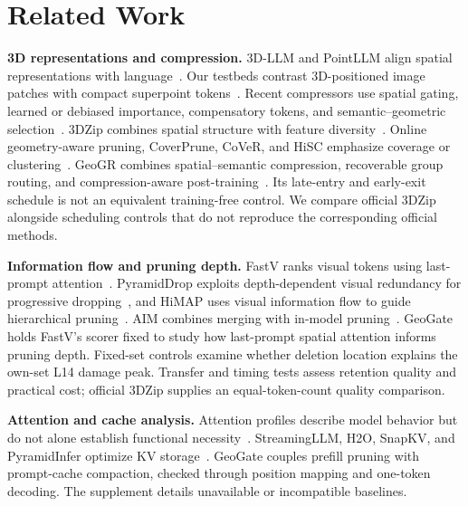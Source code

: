 \section{Related Work}
\textbf{3D representations and compression.} 3D-LLM and PointLLM align spatial representations with language~\citep{hong20233dllm,xu2024pointllm}. Our testbeds contrast 3D-positioned image patches with compact superpoint tokens~\citep{zhu2024llava3d,deng20253dllava}. Recent compressors use spatial gating, learned or debiased importance, compensatory tokens, and semantic--geometric selection~\citep{wu2025adatoken3d,huang2025fast3d, lin2026efficient3d,zhang2026hcc3d,li2026segpruner,li2026geo3dpruner}. 3DZip combines spatial structure with feature diversity~\citep{baek2026zip}. Online geometry-aware pruning, CoverPrune, CoVeR, and HiSC emphasize coverage or clustering~\citep{lai2026seeing, ling2026coverprune,bui2026cover,qu2026hisc}. GeoGR combines spatial--semantic compression, recoverable group routing, and compression-aware post-training~\citep{zheng2026geogr}. Its late-entry and early-exit schedule is not an equivalent training-free control. We compare official 3DZip alongside scheduling controls that do not reproduce the corresponding official methods.

\textbf{Information flow and pruning depth.} FastV ranks visual tokens using last-prompt attention~\citep{chen2024fastv}. PyramidDrop exploits depth-dependent visual redundancy for progressive dropping~\citep{yuan2024pyramiddrop}, and HiMAP uses visual information flow to guide hierarchical pruning~\citep{yin2025himap}. AIM combines merging with in-model pruning~\citep{zhong2025aim}. GeoGate holds FastV's scorer fixed to study how last-prompt spatial attention informs pruning depth. Fixed-set controls examine whether deletion location explains the own-set L14 damage peak. Transfer and timing tests assess retention quality and practical cost; official 3DZip supplies an equal-token-count quality comparison.

\textbf{Attention and cache analysis.} Attention profiles describe model behavior but do not alone establish functional necessity~\citep{clark2019bertology,kovaleva2019bert}. StreamingLLM, H2O, SnapKV, and PyramidInfer optimize KV storage~\citep{xiao2024streamingllm,zhang2023h2o,li2024snapkv, yang2024pyramidinfer}. GeoGate couples prefill pruning with prompt-cache compaction, checked through position mapping and one-token decoding. The supplement details unavailable or incompatible baselines.
